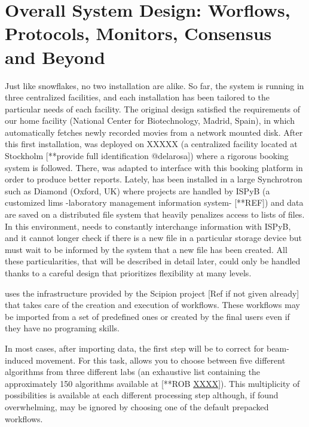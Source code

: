 \section{Overall System Design: Worflows, Protocols, Monitors, Consensus and Beyond}
\label{overall}
Just like snowflakes, no two \scipionbox installation are alike. So far, the system is running in 
three centralized facilities, and each installation has been tailored to the particular needs of each facility. The original design satisfied the requirements of our home facility (National Center for Biotechnology, Madrid, Spain), in which \scipionbox automatically fetches newly recorded movies from a network mounted disk. After this first installation, \scipionbox was deployed on XXXXX (a centralized facility located at Stockholm [**provide full identification @delarosa]) where a rigorous booking system is followed. There, \scipionbox was adapted to interface with this booking platform in order to produce better reports. Lately,  \scipionbox has been installed in a large Synchrotron  such as Diamond (Oxford, UK) where projects are handled by ISPyB (a customized lims -laboratory management information system- [**REF]) and data are saved on a distributed file system that heavily penalizes access to lists of files. In this environment, \scipionbox needs to constantly interchange information with ISPyB, and it cannot longer check if there is a new file in a particular storage device but must wait to be informed by the system that a new file has been created. All these particularities, that will be described in detail later, could only be handled thanks to a careful design that prioritizes flexibility at many levels. 

\scipionbox uses the infrastructure provided by the Scipion project [Ref if not given already]
that takes care of the creation and execution of workflows. These workflows may be imported from a set of predefined ones or created by the final users even if they have no programing skills.

In most cases, after importing data, the first step will be to correct for beam-induced movement. For this task, \scipionbox allows you to choose between five different algorithms from three different labs (an exhaustive list containing the approximately 150 algorithms available at [**ROB \url{XXXX}]). This multiplicity of possibilities is available at each different processing step although, if found overwhelming, may be ignored by choosing one of the default prepacked workflows.   

